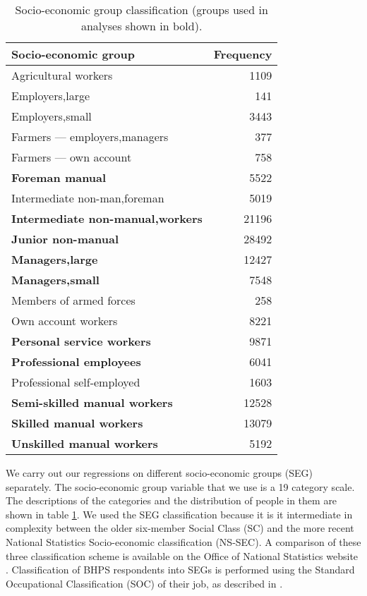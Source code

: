 \documentclass[a4paper,11pt,titlepage]{article}
\begin{document}
\begin{table}[htb]
\caption{Socio-economic group classification (groups used in analyses shown in bold).  \label{tab:SEG}}
\begin{center}
\begin{tabular}{lr}
\toprule
Socio-economic group & Frequency \\
\midrule
  Agricultural workers & 1109 \\
  Employers,large & 141 \\
  Employers,small & 3443 \\
  Farmers --- employers,managers & 377 \\
  Farmers --- own account & 758 \\
  \textbf{Foreman manual} & 5522 \\
  Intermediate non-man,foreman & 5019 \\
  \textbf{Intermediate non-manual,workers} & 21196 \\
  \textbf{Junior non-manual} & 28492 \\
  \textbf{Managers,large} & 12427 \\
  \textbf{Managers,small} & 7548 \\
  Members of armed forces & 258 \\
  Own account workers & 8221 \\
  \textbf{Personal service workers} & 9871 \\
  \textbf{Professional employees} & 6041 \\
  Professional self-employed & 1603 \\
  \textbf{Semi-skilled manual workers} & 12528 \\
  \textbf{Skilled manual workers} & 13079 \\
  \textbf{Unskilled manual workers} & 5192 \\
\bottomrule
\end{tabular}
\end{center}
\end{table}

We carry out our regressions on different socio-economic groups (SEG) separately. The socio-economic group variable that we use is a 19 category scale. The descriptions of the categories and the distribution of people in them are shown in table \ref{tab:SEG}. We used the SEG classification because it is it intermediate in complexity between the older six-member Social Class (SC) and the more recent National Statistics Socio-economic classification (NS-SEC).  A comparison of these three classification scheme is available on the Office of National Statistics website \citep{ONSnd}. Classification of BHPS respondents into SEGs is performed using the Standard Occupational Classification (SOC) of their job, as described in \citet{Taylor2010}.
\end{document}
